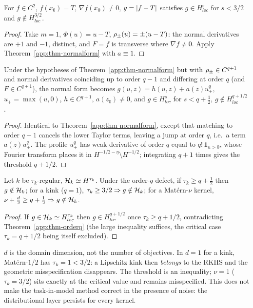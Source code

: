 \begin{corollary}
\label{app:cor-tm}
For $f\in C^2$, $f(x_0)=T$, $\nabla f(x_0)\neq0$, $g=\left\lvert f-T\right\rvert$ satisfies
$g\in H^s_{loc}$ for $s<3/2$ and $g\notin H^{3/2}_{loc}$.
\end{corollary}
\begin{proof}
Take $m=1$, $\Phi(u)=u-T$, $\rho_\pm(u)=\pm(u-T)$: the normal derivatives are
$+1$ and $-1$, distinct, and $F=f$ is transverse where $\nabla f\neq0$. Apply
Theorem~\ref{app:thm-normalform} with $a\equiv1$.
\end{proof}

\begin{theorem}
\label{app:thm-orderq}
Under the hypotheses of Theorem~\ref{app:thm-normalform} but with
$\rho_\pm\in C^{q+1}$ and normal derivatives coinciding up to order $q-1$ and
differing at order $q$ (and $F\in C^{q+1}$), the normal form becomes
$g(u,z)=h(u,z)+a(z)u_+^q$, $u_+=\max(u,0)$, $h\in C^{q+1}$, $a(z_0)\neq0$, and
$g\in H^s_{loc}$ for $s<q+\tfrac12$, $g\notin H^{q+1/2}_{loc}$.
\end{theorem}
\begin{proof}
Identical to Theorem~\ref{app:thm-normalform}, except that matching to order $q-1$
cancels the lower Taylor terms, leaving a jump at order $q$, i.e.\ a term
$a(z)u_+^q$. The profile $u_+^q$ has weak derivative of order $q$ equal to
$q!\,\mathbf{1}_{u>0}$, whose Fourier transform places it in
$H^{-1/2-\eta}\setminus H^{-1/2}$; integrating $q+1$ times gives the threshold
$q+1/2$.
\end{proof}

\begin{corollary}
\label{app:cor-nonmember}
Let $k$ be $\tau_k$-regular, $\mathcal{H}_k\simeq H^{\tau_k}$. Under the order-$q$ defect,
if $\tau_k\ge q+\tfrac12$ then $g\notin\mathcal{H}_k$; for a kink ($q=1$),
$\tau_k\ge3/2\Rightarrow g\notin\mathcal{H}_k$; for a Mat\'ern-$\nu$ kernel,
$\nu+\tfrac d2\ge q+\tfrac12\Rightarrow g\notin\mathcal{H}_k$.
\end{corollary}
\begin{proof}
If $g\in\mathcal{H}_k\simeq H^{\tau_k}_{loc}$ then $g\in H^{q+1/2}_{loc}$ once
$\tau_k\ge q+1/2$, contradicting Theorem~\ref{app:thm-orderq} (the large
inequality suffices, the critical case $\tau_k=q+1/2$ being itself excluded).
\end{proof}

\begin{remark}
$d$ is the domain dimension, not the number of objectives. In $d=1$ for a kink,
Mat\'ern-$1/2$ has $\tau_k=1<3/2$: a Lipschitz kink then \emph{belongs} to the
RKHS and the geometric misspecification disappears. The threshold is an
inequality; $\nu=1$ ($\tau_k=3/2$) sits exactly at the critical value and remains
misspecified. This does not make the task-in-model method correct in the presence
of noise: the distributional layer persists for every kernel.
\end{remark}

